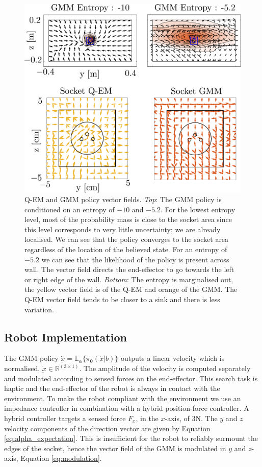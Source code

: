 \documentclass[final,3p,times,twocolumn]{elsarticle}
\newcommand{\Param}{\boldsymbol{\theta}}
\begin{document}
\begin{figure}
   \includegraphics[width=\textwidth]{./Figures/Fig/policy_vf.pdf}
  \caption{Q-EM and GMM policy vector fields. \textit{Top}: The GMM policy is conditioned on an entropy of $-10$ and $-5.2$. For the lowest entropy level,
  most of the probability mass is close to the socket area since this level corresponds to very little uncertainty; we are already localised. We can see 
  that the policy converges to the socket area regardless of the location of the believed state. For an entropy of $-5.2$ we can see that 
  the likelihood of the policy is present across wall. The vector field directs the end-effector to go towards the left or right edge of the wall. 
  \textit{Bottom}: The entropy is marginalised out, the yellow vector field is of the Q-EM and orange of the GMM. The Q-EM vector field tends 
  to be closer to a sink and there is less variation.}
  \label{fig:policy_vf}
\end{figure}


\subsection{Robot Implementation}

The GMM policy $\dot{\underbar{x}} = \mathbb{E}_{\alpha}\{\pi_{\Param}(\dot{x}|b)\}$ outputs a linear velocity which is normalised, $\dot{\underbar{x}} \in \mathbb{R}^{(3 \times 1)}$. 
The amplitude of the velocity is computed separately and modulated according to sensed forces on the end-effector.
This search task is haptic and the end-effector of the robot is always in contact with the environment. To make the robot
compliant with the environment we use an impedance controller in combination with a hybrid position-force controller. A hybrid controller
targets a sensed force $F_x$, in the $x$-axis, of 3N. The $y$ and $z$ velocity components of the direction vector are given by 
Equation \ref{eq:alpha_expectation}. This is insufficient for the robot to reliably surmount the edges of the socket,
hence the vector field of the GMM is modulated in $y$ and $z$-axis, Equation \ref{eq:modulation}.
\end{document}
